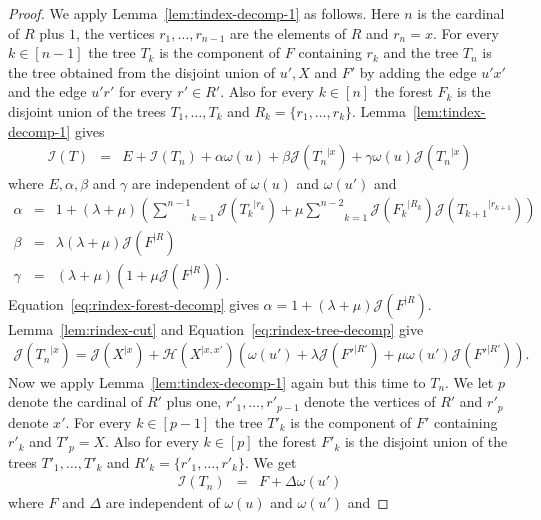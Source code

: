 \documentclass[11 pt]{modarticle}
\newcommand{\wmap}{\omega}
\newcommand{\rtree}[2]{{#1}^{\lvert #2}}
\newcommand{\indexsymbol}{\mathcal{I}}
\newcommand{\tindex}[1]{\indexsymbol(#1)}
\newcommand{\rindexsymbol}{\mathcal{J}}
\newcommand{\rindex}[2]{\rindexsymbol(\rtree{#2}{#1})}
\newcommand{\aindexsymbol}{\mathcal{H}}
\newcommand{\aindex}[3]{\aindexsymbol(\rtree{#3}{#1, #2})}
\begin{document}
\begin{proof}
We apply Lemma~\ref{lem:tindex-decomp-1} as follows. Here $n$ is the cardinal of $R$ plus $1$, the vertices $r_1, \dots, r_{n-1}$ are the elements of $R$ and $r_n = x$. For every $k \in [n-1]$ the tree $T_k$ is the component of $F$ containing $r_k$ and the tree $T_n$ is the tree obtained from the disjoint union of $u', X$ and $F'$ by adding the edge $u'x'$ and the edge $u' r'$ for every $r' \in R'$. Also for every $k \in [n]$ the forest $F_k$ is the disjoint union of the trees $T_1, \dots, T_k$ and $R_k = \{r_1, \dots, r_k\}$. Lemma~\ref{lem:tindex-decomp-1} gives
\begin{eqnarray}
	\tindex{T} & = & E + \tindex{T_n} + \alpha \wmap(u) + \beta \rindex{x}{T_n} + \gamma \wmap(u) \rindex{x}{T_n} \label{eq:tindex-decomp-proof-eq1}
\end{eqnarray}
where $E, \alpha, \beta$ and $\gamma$ are independent of $\wmap(u)$ and $\wmap(u')$ and
\begin{eqnarray*}
	\alpha & = & 1 + (\lambda + \mu) \left(\underset{k=1}{\overset{n-1}{\sum}} \rindex{r_k}{T_k} + \mu \underset{k=1}{\overset{n-2}{\sum}} \rindex{R_k}{F_k}\rindex{r_{k+1}}{T_{k+1}}\right) \\
	\beta & = & \lambda (\lambda + \mu)\rindex{R}{F} \\
	\gamma & = & (\lambda + \mu) (1 + \mu \rindex{R}{F}).
\end{eqnarray*}
Equation~\eqref{eq:rindex-forest-decomp} gives $\alpha = 1 + (\lambda + \mu) \rindex{R}{F}$. Lemma~\ref{lem:rindex-cut} and Equation~\eqref{eq:rindex-tree-decomp} give
\begin{eqnarray}
	\rindex{x}{T_n} = \rindex{x}{X} + \aindex{x}{x'}{X}\left(\wmap(u') + \lambda \rindex{R'}{F'} + \mu \wmap(u') \rindex{R'}{F'}\right). \label{eq:tindex-decomp-proof-eq2}
\end{eqnarray}
Now we apply Lemma~\ref{lem:tindex-decomp-1} again but this time to $T_n$. We let $p$ denote the cardinal of $R'$ plus one, $r'_1, \dots, r'_{p-1}$ denote the vertices of $R'$ and $r'_p$ denote $x'$. For every $k \in [p-1]$ the tree $T'_k$ is the component of $F'$ containing $r'_k$ and $T'_p = X$. Also for every $k \in [p]$ the forest $F'_k$ is the disjoint union of the trees $T'_1, \dots, T'_k$ and $R'_k = \{r'_1, \dots, r'_k\}$. We get
\begin{eqnarray}
	\tindex{T_n} & = & F + \Delta \wmap(u') \label{eq:tindex-decomp-proof-eq3}
\end{eqnarray}
where $F$ and $\Delta$ are independent of $\wmap(u)$ and $\wmap(u')$ and

\end{proof}
\end{document}
